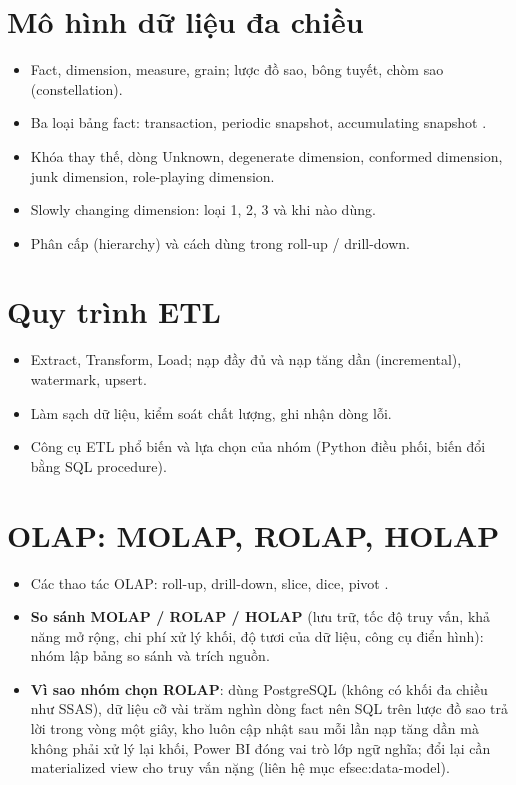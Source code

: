 \section{Mô hình dữ liệu đa chiều}
\begin{itemize}
  \item Fact, dimension, measure, grain; lược đồ sao, bông tuyết, chòm sao (constellation).
  \item Ba loại bảng fact: transaction, periodic snapshot, accumulating snapshot \cite{kimball2013}.
  \item Khóa thay thế, dòng Unknown, degenerate dimension, conformed dimension, junk dimension, role-playing dimension.
  \item Slowly changing dimension: loại 1, 2, 3 và khi nào dùng.
  \item Phân cấp (hierarchy) và cách dùng trong roll-up / drill-down.
\end{itemize}

\section{Quy trình ETL}
\begin{itemize}
  \item Extract, Transform, Load; nạp đầy đủ và nạp tăng dần (incremental), watermark, upsert.
  \item Làm sạch dữ liệu, kiểm soát chất lượng, ghi nhận dòng lỗi.
  \item Công cụ ETL phổ biến và lựa chọn của nhóm (Python điều phối, biến đổi bằng SQL procedure).
\end{itemize}

\section{OLAP: MOLAP, ROLAP, HOLAP}
\begin{itemize}
  \item Các thao tác OLAP: roll-up, drill-down, slice, dice, pivot \cite{chaudhuri1997,codd1993}.
  \item \textbf{So sánh MOLAP / ROLAP / HOLAP} (lưu trữ, tốc độ truy vấn, khả năng mở rộng, chi phí xử lý khối, độ tươi của dữ liệu, công cụ điển hình): nhóm lập bảng so sánh và trích nguồn.
  \item \textbf{Vì sao nhóm chọn ROLAP}: dùng PostgreSQL (không có khối đa chiều như SSAS), dữ liệu cỡ vài trăm nghìn dòng fact nên SQL trên lược đồ sao trả lời trong vòng một giây, kho luôn cập nhật sau mỗi lần nạp tăng dần mà không phải xử lý lại khối, Power BI đóng vai trò lớp ngữ nghĩa; đổi lại cần materialized view cho truy vấn nặng (liên hệ mục 
ef{sec:data-model}).
\end{itemize}

